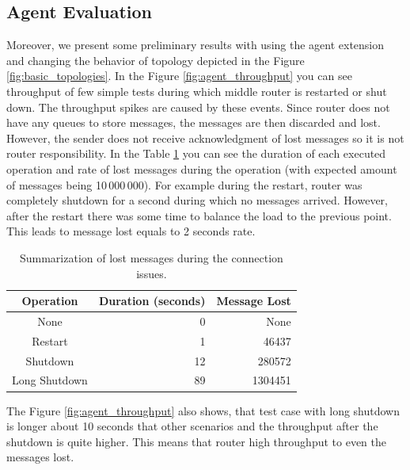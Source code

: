 
\subsection{Agent Evaluation}
Moreover, we present some preliminary results with using the agent extension and changing the behavior of topology depicted in the Figure \ref{fig:basic_topologies}. In the Figure \ref{fig:agent_throughput} you can see throughput of few simple tests during which middle router is restarted or shut down. The throughput spikes are caused by these events. Since router does not have any queues to store messages, the messages are then discarded and lost. However, the sender does not receive acknowledgment of lost messages so it is not router responsibility. In the Table \ref{tab:agent_simple} you can see the duration of each executed operation and rate of lost messages during the operation (with expected amount of messages being 10\,000\,000). For example during the restart, router was completely shutdown for a second during which no messages arrived. However, after the restart there was some time to balance the load to the previous point. This leads to message lost equals to 2 seconds rate.

\begin{table}[H]
\centering
\caption{Summarization of lost messages during the connection issues.}
\label{my-label}
\begin{tabular}{|c|r|r|}
\hline
\rowcolor[HTML]{C5E3DF}
Operation     & Duration (seconds) & Message Lost \\ \hline
None          & 0        & None         \\ \hline
Restart       & 1        & 46437        \\ \hline
Shutdown      & 12       & 280572       \\ \hline
Long Shutdown & 89       & 1304451      \\ \hline
\end{tabular}
\label{tab:agent_simple}
\end{table}

The Figure \ref{fig:agent_throughput} also shows, that test case with long shutdown is longer about 10 seconds that other scenarios and the throughput after the shutdown is quite higher. This means that router high throughput to even the messages lost.

